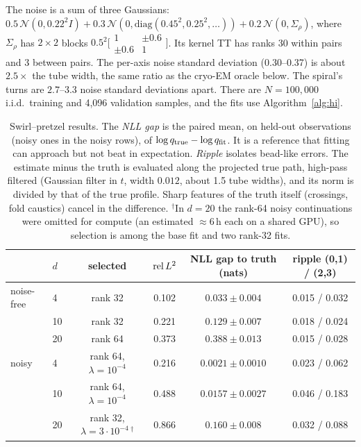 The noise is a sum of three Gaussians: $0.5\,\mathcal N(0,0.22^2I)+0.3\,\mathcal N(0,\mathrm{diag}(0.45^2,0.25^2,\dots))
+0.2\,\mathcal N(0,\Sigma_\rho)$, where $\Sigma_\rho$ has $2\times2$ blocks $0.5^2\bigl[\begin{smallmatrix}1&\pm0.6\\\pm0.6&1\end{smallmatrix}\bigr]$.
Its kernel TT has ranks 30 within pairs and 3 between pairs. The per-axis noise standard deviation (0.30--0.37) is
about $2.5\times$ the tube width, the same ratio as the cryo-EM oracle below. The spiral's turns are $2.7$--$3.3$
noise standard deviations apart. There are $N=100{,}000$ i.i.d.\ training and 4{,}096 validation samples, and the
fits use Algorithm~\ref{alg:hi}.

\begin{table}[h]
\centering
\begin{tabular}{llcccc}
\toprule
 & $d$ & selected & $\operatorname{rel}L^2$ & NLL gap to truth (nats) & ripple (0,1) / (2,3) \\
\midrule
noise-free & 4  & rank 32 & 0.102 & $0.033\pm0.004$ & 0.015 / 0.032 \\
           & 10 & rank 32 & 0.221 & $0.129\pm0.007$ & 0.018 / 0.024 \\
           & 20 & rank 64 & 0.373 & $0.388\pm0.013$ & 0.015 / 0.028 \\
\midrule
noisy      & 4  & rank 64, $\lambda=10^{-4}$ & 0.216 & $0.0021\pm0.0010$ & 0.023 / 0.062 \\
           & 10 & rank 64, $\lambda=10^{-4}$ & 0.488 & $0.0157\pm0.0027$ & 0.046 / 0.183 \\
           & 20 & rank 32, $\lambda=3\cdot10^{-4}$\,$^\dagger$ & 0.866 & $0.160\pm0.008$ & 0.032 / 0.088 \\
\bottomrule
\end{tabular}
\caption{Swirl--pretzel results. The \emph{NLL gap} is the paired mean, on held-out observations (noisy ones in the noisy
rows), of $\log q_{\rm true}-\log q_{\rm fit}$. It is a reference that fitting can approach but not beat in
expectation. \emph{Ripple} isolates bead-like errors. The estimate minus the truth is evaluated along the projected
true path, high-pass filtered (Gaussian filter in $t$, width $0.012$, about 1.5 tube widths), and its norm is divided
by that of the true profile. Sharp features of the truth itself (crossings, fold caustics) cancel in the difference.
$^\dagger$In $d=20$ the rank-64 noisy continuations were omitted for compute (an estimated $\approx 6$\,h each on a
shared GPU), so selection is among the base fit and two rank-32 fits.}
\label{tab:swirl}
\end{table}

